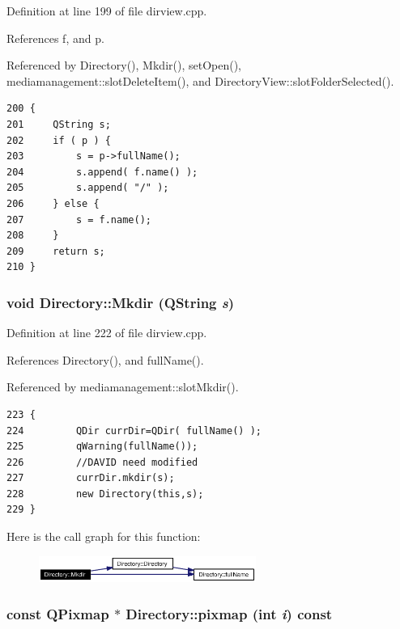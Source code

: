 Definition at line 199 of file dirview.cpp.

References f, and p.

Referenced by Directory(), Mkdir(), set\-Open(), mediamanagement::slot\-Delete\-Item(), and Directory\-View::slot\-Folder\-Selected().



\footnotesize\begin{verbatim}200 {
201     QString s;
202     if ( p ) {
203         s = p->fullName();
204         s.append( f.name() );
205         s.append( "/" );
206     } else {
207         s = f.name();
208     }
209     return s;
210 }
\end{verbatim}\normalsize 
{}
\subsubsection{\setlength{\rightskip}{0pt plus 5cm}void Directory::Mkdir (QString {\em s})}\label{classDirectory_Directorya9}




Definition at line 222 of file dirview.cpp.

References Directory(), and full\-Name().

Referenced by mediamanagement::slot\-Mkdir().



\footnotesize\begin{verbatim}223 {
224         QDir currDir=QDir( fullName() );
225         qWarning(fullName());
226         //DAVID need modified
227         currDir.mkdir(s);
228         new Directory(this,s);
229 }
\end{verbatim}\normalsize 


Here is the call graph for this function:\begin{figure}[H]
\begin{center}
\leavevmode
\includegraphics[width=201pt]{classDirectory_Directorya9_cgraph}
\end{center}
\end{figure}
\subsubsection{\setlength{\rightskip}{0pt plus 5cm}const QPixmap $\ast$ Directory::pixmap (int {\em i}) const}\label{classDirectory_Directorya7}




